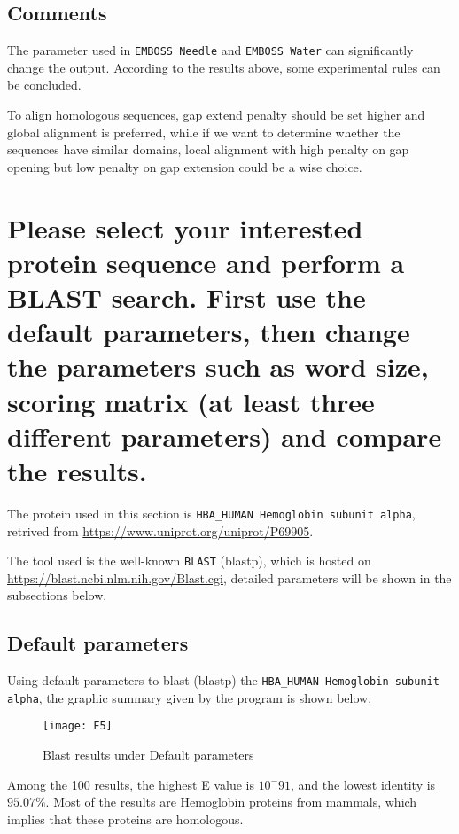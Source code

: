 \documentclass[en,black,10pt,normal]{elegantnote}
\newcommand{\upcite}[1]{\textsuperscript{\textsuperscript{\cite{#1}}}}
\begin{document}
\subsection{Comments}
The parameter used in \texttt{EMBOSS Needle} and \texttt{EMBOSS Water} can significantly
change the output. According to the results above, some experimental rules can be concluded.

To align homologous sequences, gap extend penalty should be set higher and global alignment is preferred, 
while if we want to determine whether the sequences have similar domains, local alignment with high penalty
on gap opening but low penalty on gap extension could be a wise choice.



\section{Please select your interested protein sequence and perform a BLAST search. First use the default parameters, then change the parameters such as word size, scoring matrix (at least three different parameters) and compare the results.}

The protein used in this section is \texttt{HBA\_HUMAN Hemoglobin subunit alpha}, retrived from \url{https://www.uniprot.org/uniprot/P69905}.

The tool used is the well-known \texttt{BLAST} \upcite{altschul_gapped_1997} (blastp), which is hosted on \url{https://blast.ncbi.nlm.nih.gov/Blast.cgi}, 
detailed parameters will be shown in the subsections below.

\subsection{Default parameters}

Using default parameters to blast (blastp) the \texttt{HBA\_HUMAN Hemoglobin subunit alpha},
the graphic summary given by the program is shown below.

\begin{figure}[H]
    \centering
    \texttt{[image: F5]}
    \caption{Blast results under Default parameters}
    \label{F5}
\end{figure}

Among the 100 results, the highest E value is $10^-91$, and the lowest identity is $95.07\%$.
Most of the results are Hemoglobin proteins from mammals, which implies that these proteins are homologous.
\end{document}

